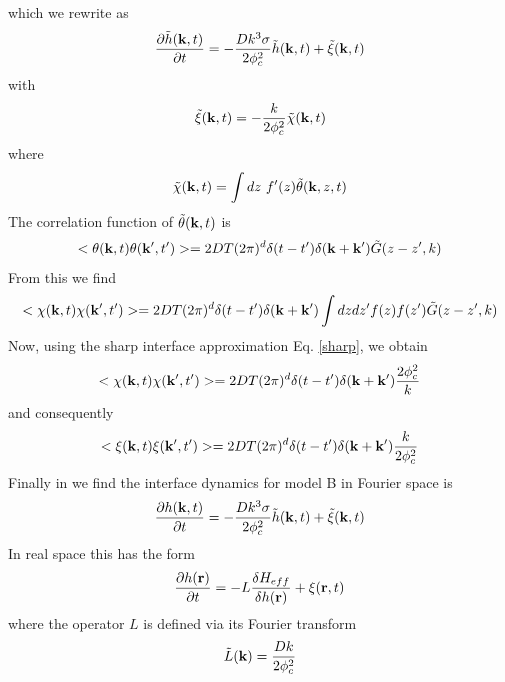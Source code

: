 which we rewrite as
\begin{equation}
    \frac{\partial \tilde h({\bf k},t)}{\partial t} = -\frac{Dk^3\sigma}{2\phi_c^2} \tilde h({\bf k},t) + \tilde \xi({\bf k},t)
\end{equation}
with 
\begin{equation}
    \tilde \xi({\bf k},t)= - \frac{k}{2\phi_c^2}\tilde \chi({\bf k},t)
\end{equation}
where 
\begin{equation}
    \tilde \chi({\bf k},t)= \int dz\  f'(z) \tilde\theta({\bf k},z,t)
\end{equation}
The correlation function of $\tilde \theta({\bf k},t)$ is 
\begin{equation}
    < \theta({\bf k},t)\theta({\bf k}',t')> = 2DT(2\pi)^d \delta(t-t') \delta({\bf k}+{\bf k'}) \tilde G(z-z',k)
\end{equation}
From this we find 
\begin{equation}
    < \chi({\bf k},t)\chi({\bf k}',t')>  = 2DT(2\pi)^d \delta(t-t') \delta({\bf k}+{\bf k'}) \int dz dz' f(z) f(z') \tilde G(z-z',k)
    \label{bstep2}
\end{equation}
Now, using the sharp interface approximation Eq. \eqref{sharp}, we obtain
\begin{equation}
    < \chi({\bf k},t)\chi({\bf k}',t')>  = 2DT(2\pi)^d \delta(t-t') \delta({\bf k}+{\bf k'}) \frac{2\phi_c^2}{k}
\end{equation}
and consequently
\begin{equation}
    < \xi({\bf k},t)\xi({\bf k}',t')> = 2DT(2\pi)^d \delta(t-t') \delta({\bf k}+{\bf k'}) \frac{k}{  2\phi_c^2}
\end{equation}
Finally in we find the interface dynamics for model B in Fourier space is
\begin{equation}
    \frac{\partial h({\bf k},t)}{\partial t} = -\frac{Dk^3\sigma}{2\phi_c^2} \tilde h({\bf k},t) + \tilde \xi({\bf k},t)
    \label{modBFT}
\end{equation}
In real space this has the form
\begin{equation}
    \frac{\partial h({\bf r})}{\partial t}= -L \frac{\delta H_{eff}}{\delta h ({\bf r})} + \xi({\bf r},t)
\end{equation}
where the operator $L$ is defined via its Fourier transform
\begin{equation}
    \tilde L({\bf k}) = \frac{Dk}{2\phi_c^2}
\end{equation}
